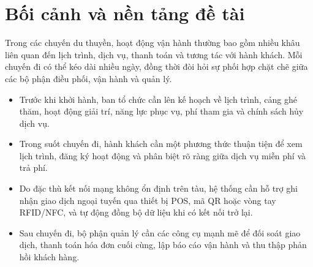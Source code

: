 \section{Bối cảnh và nền tảng đề tài}
Trong các chuyến du thuyền, hoạt động vận hành thường bao gồm nhiều khâu liên quan đến lịch trình, dịch vụ, thanh toán và tương tác với hành khách. Mỗi chuyến đi có thể kéo dài nhiều ngày, đồng thời đòi hỏi sự phối hợp chặt chẽ giữa các bộ phận điều phối, vận hành và quản lý.

\begin{itemize}
    \item Trước khi khởi hành, ban tổ chức cần lên kế hoạch về lịch trình, cảng ghé thăm, hoạt động giải trí, năng lực phục vụ, phí tham gia và chính sách hủy dịch vụ.
    \item Trong suốt chuyến đi, hành khách cần một phương thức thuận tiện để xem lịch trình, đăng ký hoạt động và phân biệt rõ ràng giữa dịch vụ miễn phí và trả phí.
    \item Do đặc thù kết nối mạng không ổn định trên tàu, hệ thống cần hỗ trợ ghi nhận giao dịch ngoại tuyến qua thiết bị POS, mã QR hoặc vòng tay RFID/NFC, và tự động đồng bộ dữ liệu khi có kết nối trở lại.
    \item Sau chuyến đi, bộ phận quản lý cần các công cụ mạnh mẽ để đối soát giao dịch, thanh toán hóa đơn cuối cùng, lập báo cáo vận hành và thu thập phản hồi khách hàng.
\end{itemize}